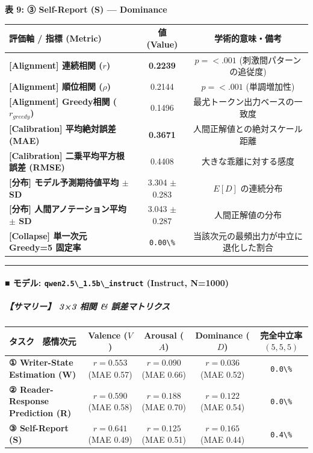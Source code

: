 \textbf{表 9: ③ Self-Report (S) — Dominance}
\begin{center}
\small
\begin{tabular}{lcc}
\toprule
\textbf{評価軸 / 指標 (Metric)} & \textbf{値 (Value)} & \textbf{学術的意味・備考} \\
\midrule
\textbf{[Alignment] 連続相関 ($r$)} & \textbf{0.2239} & $p = <.001 $ (刺激間パターンの追従度) \\
\textbf{[Alignment] 順位相関 ($\rho$)} & 0.2144 & $p = <.001 $ (単調増加性) \\
\textbf{[Alignment] Greedy相関 ($r_{greedy}$)} & 0.1496 & 最尤トークン出力ベースの一致度 \\
\textbf{[Calibration] 平均絶対誤差 (MAE)} & \textbf{0.3671} & 人間正解値との絶対スケール距離 \\
\textbf{[Calibration] 二乗平均平方根誤差 (RMSE)} & 0.4408 & 大きな乖離に対する感度 \\
\textbf{[分布] モデル予測期待値平均 $\pm$ SD} & 3.304 $\pm$ 0.283 & $E[D]$ の連続分布 \\
\textbf{[分布] 人間アノテーション平均 $\pm$ SD} & 3.043 $\pm$ 0.287 & 人間正解値の分布 \\
\textbf{[Collapse] 単一次元 Greedy=5 固定率} & \texttt{0.00\textbackslash{}\%} & 当該次元の最頻出力が中立に退化した割合 \\
\bottomrule
\end{tabular}
\end{center}


\vspace{0.5em}\hrule\vspace{0.5em}

\paragraph{■ モデル: \texttt{qwen2.5\textbackslash{}\_1.5b\textbackslash{}\_instruct} (Instruct, N=1000)}

\subparagraph{【サマリー】 3×3 相関 \& 誤差マトリクス}
\begin{center}
\small
\begin{tabular}{lcccc}
\toprule
\textbf{タスク \ 感情次元} & \textbf{Valence ($V$)} & \textbf{Arousal ($A$)} & \textbf{Dominance ($D$)} & \textbf{完全中立率 $(5,5,5)$} \\
\midrule
\textbf{① Writer-State Estimation (W)} & \textbf{$r=0.553$} (MAE 0.57) & \textbf{$r=0.090$} (MAE 0.66) & \textbf{$r=0.036$} (MAE 0.52) & \texttt{0.0\textbackslash{}\%} \\
\textbf{② Reader-Response Prediction (R)} & \textbf{$r=0.590$} (MAE 0.58) & \textbf{$r=0.188$} (MAE 0.70) & \textbf{$r=0.122$} (MAE 0.54) & \texttt{0.0\textbackslash{}\%} \\
\textbf{③ Self-Report (S)} & \textbf{$r=0.641$} (MAE 0.49) & \textbf{$r=0.125$} (MAE 0.51) & \textbf{$r=0.165$} (MAE 0.44) & \texttt{0.4\textbackslash{}\%} \\
\bottomrule
\end{tabular}
\end{center}


